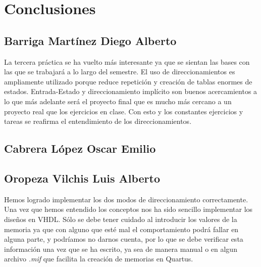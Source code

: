 \documentclass[12pt]{article}
\def\luis{Oropeza Vilchis Luis Alberto}
\def\diego{Barriga Mart\'inez Diego Alberto}
\def\emilio{Cabrera L\'opez Oscar Emilio}
\begin{document}
\section*{Conclusiones}

\subsection*{\diego}
La tercera pr\'actica se ha vuelto m\'as interesante ya que se sientan las bases con las que se trabajar\'a a lo largo del semestre. El uso de direccionamientos es ampliamente utilizado porque reduce repetici\'on y creaci\'on de tablas enormes de estados. Entrada-Estado y direccionamiento impl\'icito son buenos acercamientos a lo que m\'as adelante ser\'a el proyecto final que es mucho m\'as cercano a un proyecto real que los ejercicios en clase. Con esto y los constantes ejercicios y tareas se reafirma el entendimiento de los direccionamientos.
\subsection*{\emilio}
\subsection*{\luis}
Hemos logrado implementar los dos modos de direccionamiento correctamente. Una vez que hemos entendido los conceptos nos ha sido sencillo implementar los diseños en VHDL. Sólo se debe tener cuidado al introducir los valores de la memoria ya que con alguno que esté mal el comportamiento podrá fallar en alguna parte, y podr\'iamos no darnos cuenta, por lo que se debe verificar esta información una vez que se ha escrito, ya sea de manera manual o en algun archivo \textit{.mif} que facilita la creaci\'on de memorias en Quartus.
\end{document}
